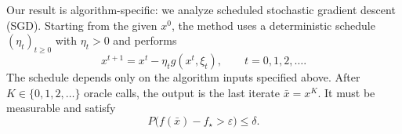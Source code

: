 \documentclass[10pt]{article}
\theoremstyle{definition}
\begin{document}
Our result is algorithm-specific: we analyze scheduled stochastic gradient descent (SGD). Starting from the given $x^0$, the method uses a deterministic schedule $(\eta_t)_{t\geq0}$ with $\eta_t>0$ and performs
\[
x^{t+1}=x^t-\eta_t g(x^t,\xi_t),
\qquad t=0,1,2,\ldots.
\]
The schedule depends only on the algorithm inputs specified above. After $K\in\{0,1,2,\ldots\}$ oracle calls, the output is the last iterate $\bar{x}=x^K$. It must be measurable and satisfy
\[
P\bigl(f(\bar{x})-f_\star>\varepsilon\bigr)\leq\delta.
\]
\end{document}
